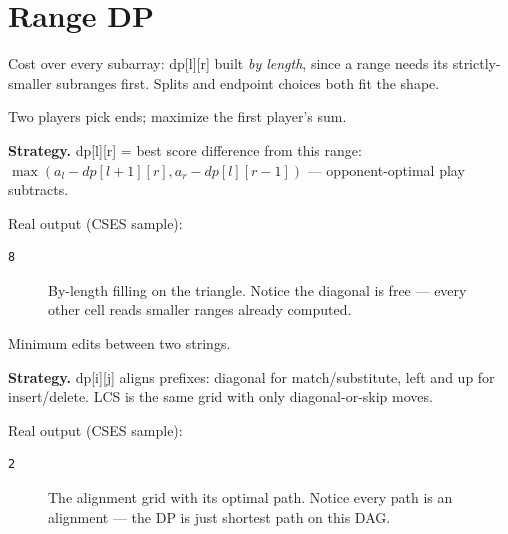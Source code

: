 \section{Range DP}\label{sec:range}
Cost over every subarray: dp[l][r] built \emph{by length}, since a
range needs its strictly-smaller subranges first. Splits and
endpoint choices both fit the shape.
\begin{example}\label{ex:removal}
Two players pick ends; maximize the first player's sum.
\par\smallskip
\textbf{Strategy.} dp[l][r] = best score difference from this range:
$\max(a_l - dp[l{+}1][r], a_r - dp[l][r{-}1])$ --- opponent-optimal
play subtracts.
\par\smallskip
\begin{solution}

Real output (CSES sample):
\begin{lstlisting}[numbers=none]
8
\end{lstlisting}
\end{solution}
\end{example}
\begin{figure}[ht]\centering

\caption{By-length filling on the triangle. Notice the diagonal is
free --- every other cell reads smaller ranges already computed.}
\label{fig:rangetri}
\end{figure}
\begin{example}\label{ex:edit}
Minimum edits between two strings.
\par\smallskip
\textbf{Strategy.} dp[i][j] aligns prefixes: diagonal for
match/substitute, left and up for insert/delete. LCS is the same
grid with only diagonal-or-skip moves.
\par\smallskip
\begin{solution}

Real output (CSES sample):
\begin{lstlisting}[numbers=none]
2
\end{lstlisting}
\end{solution}
\end{example}
\begin{figure}[ht]\centering

\caption{The alignment grid with its optimal path. Notice every
path is an alignment --- the DP is just shortest path on this DAG.}
\label{fig:editpath}
\end{figure}

